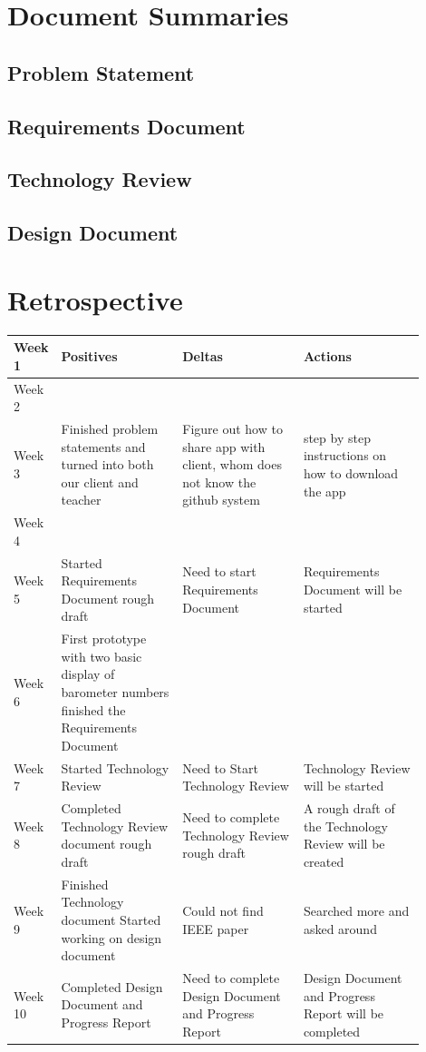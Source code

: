 \documentclass[onecolumn, draftclsnofoot,10pt, compsoc]{IEEEtran}
\begin{document}
\section{Document Summaries}

\subsection{Problem Statement}

\subsection{Requirements Document}

\subsection{Technology Review}

\subsection{Design Document}

\section{Retrospective}
\begin{center}
	\begin{tabular}{| l | p{0.3\linewidth} | p{0.3\linewidth} | p{0.3\linewidth} |}
		\hline
		Week 1 & Positives & Deltas & Actions \\ \hline
		Week 2 & & & \\ \hline				%
		Week 3 & Finished problem statements and turned into both our client and teacher
 & Figure out how to share app with client, whom does not know the github system
 & step by step instructions on how to download the app \\ \hline
		Week 4 & & & \\ \hline
		Week 5 & Started Requirements Document rough draft & Need to start Requirements Document & Requirements Document will be started \\ \hline
		Week 6 & First prototype with two basic display of barometer numbers
  finished the Requirements Document & & \\ \hline
		Week 7 & Started Technology Review & Need to Start Technology Review & Technology Review will be started \\ \hline
		Week 8 & Completed Technology Review document rough draft & Need to complete Technology Review rough draft & A rough draft of the Technology Review will be created \\ \hline
		Week 9 &Finished Technology document
Started working on design document
 & Could not find IEEE paper & Searched more and asked around\\ \hline
		Week 10 & Completed Design Document and Progress Report & Need to complete Design Document and Progress Report & Design Document and Progress Report will be completed \\ \hline

	\end{tabular}
\end{center}
\end{document}
